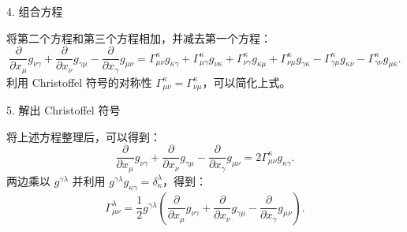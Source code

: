 \documentclass[12pt, a4paper, oneside, UTF8]{ctexbook}  %
\newcommand{\pa}{\partial}
\begin{document}
\begin{lemma}
\begin{tui}
        4. 组合方程
        
           将第二个方程和第三个方程相加，并减去第一个方程：
           \[
           \frac{\pa}{\pa x_\mu} g_{\nu\gamma} + \frac{\pa}{\pa x_\nu} g_{\gamma\mu} - \frac{\pa}{\pa x_\gamma} g_{\mu\nu} = \Gamma^\kappa_{\mu\nu} g_{\kappa\gamma} + \Gamma^\kappa_{\mu\gamma} g_{\nu\kappa} + \Gamma^\kappa_{\nu\gamma} g_{\kappa\mu} + \Gamma^\kappa_{\nu\mu} g_{\gamma\kappa} - \Gamma^\kappa_{\gamma\mu} g_{\kappa\nu} - \Gamma^\kappa_{\gamma\nu} g_{\mu\kappa}.
           \]
           利用 Christoffel 符号的对称性 \(\Gamma^\kappa_{\mu\nu} = \Gamma^\kappa_{\nu\mu}\)，可以简化上式。
        
        5. 解出 Christoffel 符号
        
           将上述方程整理后，可以得到：
           \[
           \frac{\pa}{\pa x_\mu} g_{\nu\gamma} + \frac{\pa}{\pa x_\nu} g_{\gamma\mu} - \frac{\pa}{\pa x_\gamma} g_{\mu\nu} = 2 \Gamma^\kappa_{\mu\nu} g_{\kappa\gamma}.
           \]
           两边乘以 \(g^{\gamma\lambda}\) 并利用 \(g^{\gamma\lambda} g_{\kappa\gamma} = \delta^\lambda_\kappa\)，得到：
           \[
           \Gamma^\lambda_{\mu\nu} = \frac{1}{2} g^{\gamma\lambda} \left( \frac{\pa}{\pa x_\mu} g_{\nu\gamma} + \frac{\pa}{\pa x_\nu} g_{\gamma\mu} - \frac{\pa}{\pa x_\gamma} g_{\mu\nu} \right).
           \]        
    \end{tui}
\end{lemma}
\end{document}
